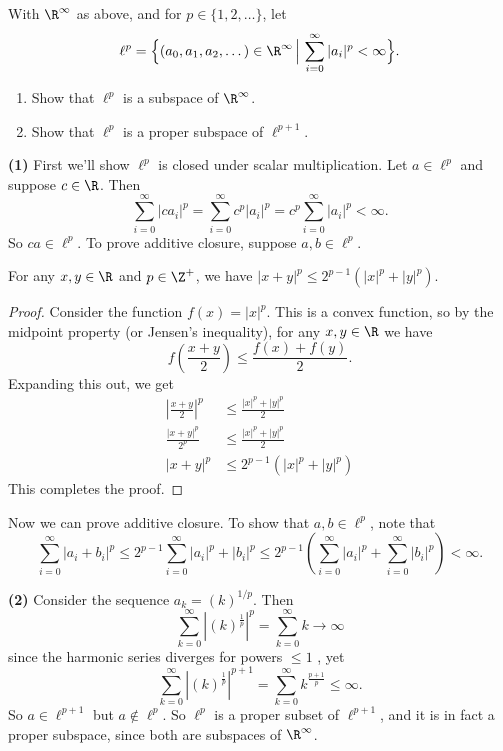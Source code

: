 \begin{problem}
  With $\R^\infty$ as above, and for $p\in \{1,2,\dots\}$, let 
  \[\ell^p=\Bigl\{(a_0,a_1,a_2,\dots)\in \R^\infty\,\Big|\,\sum\limits_{i=0}^\infty |a_i|^p < \infty\Bigr\}.\]
  \begin{enumerate}
    \item Show that $\ell^p$ is a subspace of $\R^\infty$.
    \item Show that $\ell^p$ is a proper subspace of $\ell^{p+1}$.
  \end{enumerate}
\end{problem}

\textbf{(1)} First we'll show $\ell^p$ is closed under scalar multiplication. Let $a\in \ell^p$ and suppose $c\in \R$. Then
\[
  \sum^\infty_{i=0}|ca_i|^p=\sum^\infty_{i=0}c^p|a_i|^p=c^p\sum^\infty_{i=0}|a_i|^p < \infty
.\]    
So $ca\in \ell^p$. To prove additive closure, suppose $a,b\in \ell^p$.  
\begin{lemma}
  For any $x,y\in \R$ and $p\in \Z^+$, we have $|x+y|^p\leq 2^{p-1}(|x|^p+|y|^p)$.   
\end{lemma}
\begin{proof}
  Consider the function $f(x)=|x|^p$. This is a convex function, so by the midpoint property (or Jensen's inequality), for any $x,y\in \R$ we have 
  \[
    f\left(\frac{x+y}{2}\right)\leq \frac{f(x)+f(y)}{2}
  .\]
  Expanding this out, we get
  \begin{align*}
    \left|\frac{x+y}{2}\right|^p&\leq \frac{|x|^p+|y|^p}{2}\\
    \frac{|x+y|^p}{2^p}&\leq  \frac{|x|^p+|y|^p}{2}\\
    |x+y|^p&\leq 2^{p-1}(|x|^p+|y|^p)
  \end{align*}
  This completes the proof.
\end{proof}

Now we can prove additive closure. To show that $a,b\in \ell^p$, note that
\[
  \sum^\infty_{i=0}|a_i+b_i|^p\leq 2^{p-1}\sum^\infty_{i=0}|a_i|^p+|b_i|^p \leq 2^{p-1}\left(\sum^\infty_{i=0}|a_i|^p+\sum^\infty_{i=0}|b_i|^p\right) < \infty
.\] 

\textbf{(2)} Consider the sequence $a_k=(k)^{1 /p}$. Then
\[
  \sum_{k=0}^\infty \left|(k)^{\frac{1}{p}}\right|^p=\sum_{k=0}^\infty k \to \infty
\]
since the harmonic series diverges for powers $\leq 1$ , yet
\[
  \sum_{k=0}^\infty \left|(k)^{\frac{1}{p}}\right|^{p+1}=\sum_{k=0}^\infty k^{\frac{p+1}{p}} \leq \infty
.\]
So $a\in \ell^{p+1}$ but $a\notin \ell^p$. So $\ell^p$ is a proper subset of $\ell^{p+1}$, and it is in fact a proper subspace, since both are subspaces of $\R^\infty$.
